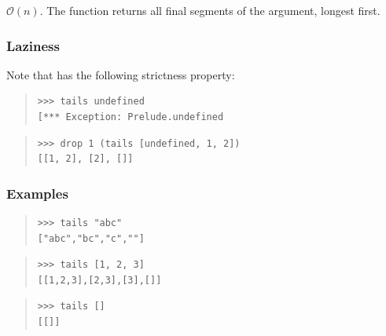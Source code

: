 \begin{haddockdesc}
\item[\begin{tabular}{@{}l}
tails :: {\char 91}a{\char 93} -> {\char 91}{\char 91}a{\char 93}{\char 93}
\end{tabular}]
{\haddockbegindoc
\(\mathcal{O}(n)\). The  function returns all final segments of the
 argument, longest first.\par
\subsubsection*{\textbf{Laziness}}
Note that  has the following strictness property:
 \par
\begin{quote}
{\haddockverb\begin{verbatim}
>>> tails undefined
[*** Exception: Prelude.undefined

\end{verbatim}}
\end{quote}
\begin{quote}
{\haddockverb\begin{verbatim}
>>> drop 1 (tails [undefined, 1, 2])
[[1, 2], [2], []]

\end{verbatim}}
\end{quote}
\subsubsection*{\textbf{Examples}}
\begin{quote}
{\haddockverb\begin{verbatim}
>>> tails "abc"
["abc","bc","c",""]

\end{verbatim}}
\end{quote}
\begin{quote}
{\haddockverb\begin{verbatim}
>>> tails [1, 2, 3]
[[1,2,3],[2,3],[3],[]]

\end{verbatim}}
\end{quote}
\begin{quote}
{\haddockverb\begin{verbatim}
>>> tails []
[[]]

\end{verbatim}}
\end{quote}}
\end{haddockdesc}
